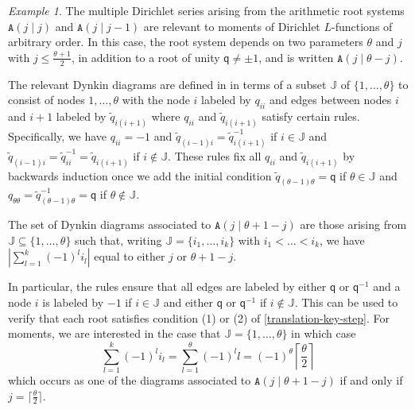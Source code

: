 \documentclass[11pt,letterpaper]{article}
\theoremstyle{definition}
\theoremstyle{remark}
\newtheorem{example}[theorem]{Example}
\numberwithin{equation}{section}
\theoremstyle{dotless}
\newcommand{\qq}{\mathbf{ \mathsf{q}}} %
\renewcommand{\tilde}{\widetilde}
\begin{document}
\begin{example}\label{super-An} The multiple Dirichlet series arising from the arithmetic root systems $\mathtt A(j\mid j)$ and $\mathtt A(j \mid j-1)$ are relevant to moments of Dirichlet $L$-functions of arbitrary order. In this case, the root system depends on two parameters $\theta$ and $j$ with $j \leq \frac{\theta+1}{2}$, in addition to a root of unity $\qq\neq \pm 1$,  and is written $\mathtt A(j\mid \theta-j)$.

The relevant Dynkin diagrams are defined in \cite[\S5]{AndruskiewitschAngiono} in terms of a subset $\mathbb J$ of $\{1,\dots, \theta\}$ to consist of nodes $1,\dots, \theta$ with the node $i$ labeled by $q_{ii}$ and edges between nodes $i$ and $i+1$ labeled by $\tilde{q}_{i(i+1)}$ where $q_{ii}$ and $\tilde{q}_{i(i+1)}$ satisfy certain rules. Specifically, we have $q_{ii}=-1$ and $\tilde{q}_{(i-1)i} = \tilde{q}_{i(i+1)}^{-1}$ if $i\in \mathbb J$ and $\tilde{q}_{(i-1)i } = \tilde{q}_{ii}^{-1}= \tilde{q}_{i(i+1)}$ if $i\notin\mathbb J$. These rules fix all $q_{ii}$ and $\tilde{q}_{i(i+1)}$ by backwards induction once we add the initial condition  $\tilde{q}_{(\theta-1)\theta}= \qq$ if $\theta\in \mathbb J$ and $q_{\theta\theta}=\tilde{q}_{(\theta-1)\theta}^{-1} = \qq$ if $\theta\notin \mathbb J$.

The set of Dynkin diagrams associated to $\mathtt A(j\mid \theta+1-j)$ are those arising from $\mathbb J  \subseteq \{1,\dots, \theta\}$ such that, writing $\mathbb J = \{i_1,\dots, i_k\}$ with $i_1< \dots < i_k$, we have $ \left| \sum_{l=1}^k (-1)^l i_l\right|$ equal to either $j$ or $\theta+1-j$.

In particular, the rules ensure that all edges are labeled by either $\qq$ or $\qq^{-1}$ and a node $i$ is labeled by $-1$ if $i\in \mathbb J$ and either $\qq$ or $\qq^{-1}$ if $i\notin \mathbb J$.  This can be used to verify that each root satisfies condition (1) or (2) of \ref{translation-key-step}. For moments, we are interested in the case that $\mathbb J = \{1,\dots,\theta\}$ in which case \[  \sum_{l=1}^k (-1)^l i_l = \sum_{l=1}^{\theta} (-1)^l l = (-1)^\theta \left\lceil \frac{\theta}{2} \right\rceil \] which occurs as one of the diagrams associated to $\mathtt A(j\mid \theta+1-j)$ if and only if $j = \lceil \frac{\theta}{2} \rceil $.


\end{example}
\end{document}
